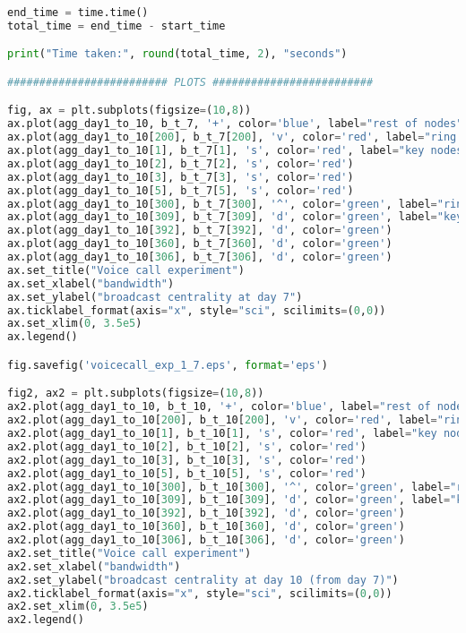 \begin{lstlisting}[language=Python, caption=Voice call experiment]
end_time = time.time()
total_time = end_time - start_time

print("Time taken:", round(total_time, 2), "seconds")

######################### PLOTS #########################

fig, ax = plt.subplots(figsize=(10,8))
ax.plot(agg_day1_to_10, b_t_7, '+', color='blue', label="rest of nodes")
ax.plot(agg_day1_to_10[200], b_t_7[200], 'v', color='red', label="ring leader ID before day 7")
ax.plot(agg_day1_to_10[1], b_t_7[1], 's', color='red', label="key nodes IDs before day 7")
ax.plot(agg_day1_to_10[2], b_t_7[2], 's', color='red') 
ax.plot(agg_day1_to_10[3], b_t_7[3], 's', color='red') 
ax.plot(agg_day1_to_10[5], b_t_7[5], 's', color='red')
ax.plot(agg_day1_to_10[300], b_t_7[300], '^', color='green', label="ring leader ID after day 7")
ax.plot(agg_day1_to_10[309], b_t_7[309], 'd', color='green', label="key nodes IDs after day 7")
ax.plot(agg_day1_to_10[392], b_t_7[392], 'd', color='green') 
ax.plot(agg_day1_to_10[360], b_t_7[360], 'd', color='green') 
ax.plot(agg_day1_to_10[306], b_t_7[306], 'd', color='green')
ax.set_title("Voice call experiment")
ax.set_xlabel("bandwidth")
ax.set_ylabel("broadcast centrality at day 7")
ax.ticklabel_format(axis="x", style="sci", scilimits=(0,0))
ax.set_xlim(0, 3.5e5)
ax.legend()

fig.savefig('voicecall_exp_1_7.eps', format='eps')

fig2, ax2 = plt.subplots(figsize=(10,8))
ax2.plot(agg_day1_to_10, b_t_10, '+', color='blue', label="rest of nodes")
ax2.plot(agg_day1_to_10[200], b_t_10[200], 'v', color='red', label="ring leader ID before day 7")
ax2.plot(agg_day1_to_10[1], b_t_10[1], 's', color='red', label="key nodes IDs before day 7")
ax2.plot(agg_day1_to_10[2], b_t_10[2], 's', color='red') 
ax2.plot(agg_day1_to_10[3], b_t_10[3], 's', color='red') 
ax2.plot(agg_day1_to_10[5], b_t_10[5], 's', color='red')
ax2.plot(agg_day1_to_10[300], b_t_10[300], '^', color='green', label="ring leader ID after day 7") 
ax2.plot(agg_day1_to_10[309], b_t_10[309], 'd', color='green', label="key nodes IDs after day 7")
ax2.plot(agg_day1_to_10[392], b_t_10[392], 'd', color='green') 
ax2.plot(agg_day1_to_10[360], b_t_10[360], 'd', color='green') 
ax2.plot(agg_day1_to_10[306], b_t_10[306], 'd', color='green')
ax2.set_title("Voice call experiment")
ax2.set_xlabel("bandwidth")
ax2.set_ylabel("broadcast centrality at day 10 (from day 7)")
ax2.ticklabel_format(axis="x", style="sci", scilimits=(0,0))
ax2.set_xlim(0, 3.5e5)
ax2.legend()


\end{lstlisting}
